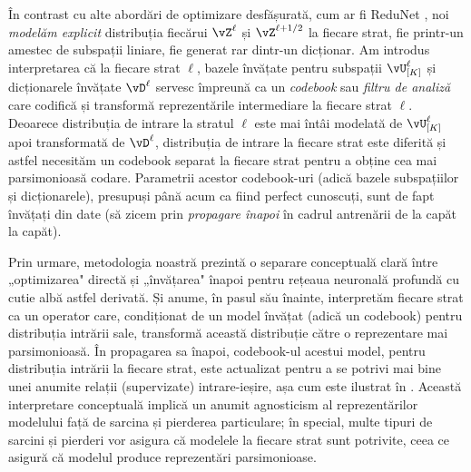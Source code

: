 \documentclass[../../book-main_ro.tex]{subfiles}
\begin{document}
\begin{remark}\label{sub:forward_backward}
    În contrast cu alte abordări de optimizare desfășurată, cum ar fi ReduNet \cite{chan2021redunet}, noi \textit{modelăm explicit} distribuția fiecărui $\vZ^\ell$ și $\vZ^{\ell + 1/2}$ la fiecare strat, fie printr-un amestec de subspații liniare, fie generat rar dintr-un dicționar. Am introdus interpretarea că la fiecare strat \(\ell\), bazele învățate pentru subspații \(\vU_{[K]}^{\ell}\) și dicționarele învățate \(\vD^{\ell}\) servesc împreună ca un \textit{codebook} sau \textit{filtru de analiză} care codifică și transformă reprezentările intermediare la fiecare strat \(\ell\). Deoarece distribuția de intrare la stratul \(\ell\) este mai întâi modelată de \(\vU_{[K]}^{\ell}\) apoi transformată de \(\vD^{\ell}\), distribuția de intrare la fiecare strat este diferită și astfel necesităm un codebook separat la fiecare strat pentru a obține cea mai parsimonioasă codare. Parametrii acestor codebook-uri (adică bazele subspațiilor și dicționarele), presupuși până acum ca fiind perfect cunoscuți, sunt de fapt învățați din date (să zicem prin \textit{propagare înapoi} în cadrul antrenării de la capăt la capăt).
    
    Prin urmare, metodologia noastră prezintă o separare conceptuală clară între „optimizarea" directă și „învățarea" înapoi pentru rețeaua neuronală profundă cu cutie albă astfel derivată. Și anume, în pasul său înainte, interpretăm fiecare strat ca un operator care, condiționat de un model învățat (adică un codebook) pentru distribuția intrării sale, transformă această distribuție către o reprezentare mai parsimonioasă. În propagarea sa înapoi, codebook-ul acestui model, pentru distribuția intrării la fiecare strat, este actualizat pentru a se potrivi mai bine unei anumite relații (supervizate) intrare-ieșire, așa cum este ilustrat în . Această interpretare conceptuală implică un anumit agnosticism al reprezentărilor modelului față de sarcina și pierderea particulare; în special, multe tipuri de sarcini și pierderi vor asigura că modelele la fiecare strat sunt potrivite, ceea ce asigură că modelul produce reprezentări parsimonioase.
\end{remark}
\end{document}
